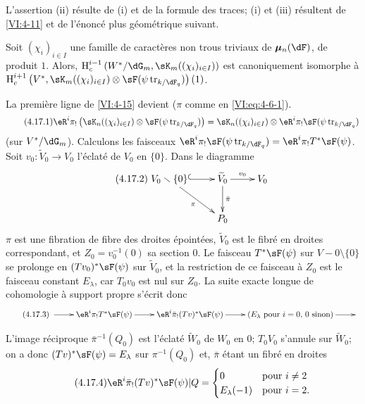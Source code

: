 L'assertion (ii) r\'esulte de (i) et de la formule des traces; (i) et (iii) 
r\'esultent de \ref{VI:4-11} et de l'\'enonc\'e plus g\'eom\'etrique suivant. 





\begin{proposition_}\label{VI:4-17}
Soit $(\chi_i)_{i\in I}$ une famille de caract\`eres non trous triviaux de 
$\dmu_n(\dF)$, de produit $1$. Alors, 
$\h_c^{i-1}\left(W^\ast/\dG_m,\sK_m((\chi_i)_{i\in I})\right)$ est 
canoniquement isomorphe \`a 
\newline
$\h_c^{i+1}\left(V^\ast,\sK_m((\chi_i)_{i\in I})\otimes \sF(\psi\tr_{k/\dF_q})\right)(1)$. 
\end{proposition_}

La premi\`ere ligne de \ref{VI:4-15} devient ($\pi$ comme en 
\eqref{VI:eq:4-6-1}). 
\begin{equation*}\tag{4.17.1}\label{VI:eq:4-17-1}
  \eR^i \pi_!\left(\sK_n((\chi_i)_{i\in I})\otimes \sF(\psi \tr_{k/\dF_q})\right) = \sK_n((\chi_i)_{i\in I}) \otimes \eR^i \pi_! \sF(\psi\tr_{k/\dF_q}) 
\end{equation*}
(sur $V^\ast/\dG_m$). Calculons les faisceaux 
$\eR^i\pi_! \sF(\psi\tr_{k/\dF_q}) = \eR^i \pi_! T^\ast \sF(\psi)$. Soit 
$v_0:\widetilde V_0 \to V_0$ l'\'eclat\'e de $V_0$ en $\{0\}$. Dans le 
diagramme 
\begin{equation*}\tag{4.17.2}\label{VI:eq:4-17-2}
\xymatrix{
  V_0\setminus \{0\} \ar@{^{(}->}[r] \ar[dr]_-\pi 
    & \widetilde V_0 \ar[r]^-{v_0} \ar[d]^-{\bar\pi} 
    & V_0 \\
  & P_0 
}
\end{equation*}
$\pi$ est une fibration de fibre des droites \'epoint\'ees, $\widetilde V_0$ 
est le fibr\'e en droites correspondant, et $Z_0=v_0^{-1}(0)$ sa section $0$. 
Le faisceau $T^\ast\sF(\psi)$ sur $V-0\setminus \{0\}$ se prolonge en 
$(T v_0)^\ast \sF(\psi)$ sur $\widetilde V_0$, et la restriction de ce faisceau 
\`a $Z_0$ est le faisceau constant $E_\lambda$, car $T_0 v_0$ est nul sur 
$Z_0$. La suite exacte longue de cohomologie \`a support propre s'\'ecrit 
donc 
\begin{equation*}\tag{4.17.3}\label{VI:eq:4-17-3}
\xymatrix{
  \ar[r] 
    & \eR^i \pi_! T^\ast \sF(\psi) \ar[r] 
    & \eR^i \bar\pi_! (T v)^\ast \sF(\psi) \ar[r] 
    & (E_\lambda\text{ pour $i=0$, $0$ sinon}) \ar[r] 
    & 
}
\end{equation*}

L'image r\'eciproque $\bar\pi^{-1}(Q_0)$ est l'\'eclat\'e $\widetilde W_0$ de 
$W_0$ en $0$; $T_0 V_0$ s'annule sur $\widetilde W_0$; on a donc 
$(T v)^\ast \sF(\psi)=E_\lambda$ sur $\pi^{-1}(Q_0)$ et, $\bar\pi$ \'etant un 
fibr\'e en droites 
\begin{equation*}\tag{4.17.4}\label{VI:eq:4-17-4}
  \eR^i \bar\pi_! (T v)^\ast \sF(\psi)|Q = 
    \begin{cases}
      0 & \text{pour $i\ne 2$} \\
      E_\lambda(-1) & \text{pour $i=2$.} 
    \end{cases} 
\end{equation*}

